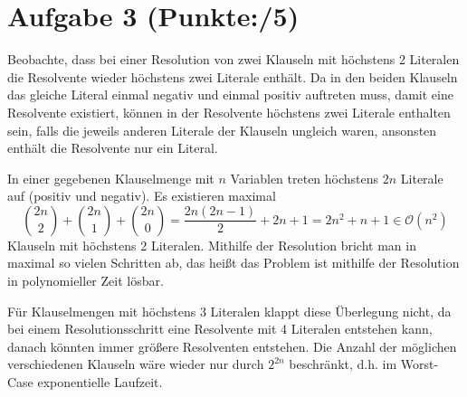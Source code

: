 \documentclass[11pt, a4paper]{article}
\newcommand{\pp}{5}
\begin{document}
\section*{Aufgabe 3 (Punkte:\qquad/\pp)}
\begin{adjustwidth}{20pt}{20pt}
Beobachte, dass bei einer Resolution von zwei Klauseln mit höchstens 2 Literalen die Resolvente wieder höchstens zwei Literale enthält. Da in den beiden Klauseln das gleiche Literal einmal
negativ und einmal positiv auftreten muss, damit eine Resolvente existiert, können in der Resolvente höchstens zwei Literale enthalten sein, falls die jeweils anderen Literale der Klauseln ungleich waren, ansonsten enthält die Resolvente nur ein Literal.\par
In einer gegebenen Klauselmenge mit $n$ Variablen treten höchstens $2n$ Literale auf (positiv und negativ). Es existieren maximal
\[
	\binom{2n}{2}+\binom{2n}{1}+\binom{2n}{0} = \frac{2n(2n-1)}{2}+2n+1 = 2n^2+n+1 \in \mathcal{O}(n^2)
\]
Klauseln mit höchstens 2 Literalen. Mithilfe der Resolution bricht man in maximal so vielen Schritten ab, das heißt das Problem ist mithilfe der Resolution in polynomieller Zeit lösbar.\par
Für Klauselmengen mit höchstens 3 Literalen klappt diese Überlegung nicht, da bei einem Resolutionsschritt eine Resolvente mit 4 Literalen entstehen kann, danach könnten immer
größere Resolventen entstehen. Die Anzahl der möglichen verschiedenen Klauseln wäre wieder nur durch $2^{2n}$ beschränkt, d.h. im Worst-Case exponentielle Laufzeit.
\end{adjustwidth}
\end{document}
